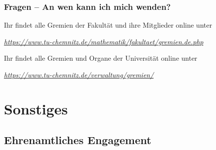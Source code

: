 \documentclass[10pt]{beamer}
\makeatletter
\newcommand{\highl}[1]{\color{tuccolor@ma}#1\color{black}}
\makeatother
\begin{document}
\begin{frame}
	\frametitle{Fragen -- An wen kann ich mich wenden?}

	Ihr findet alle Gremien der Fakultät und ihre Mitglieder online unter 

	\vspace*{0.5cm}

	\begin{center}
		\highl{\textit{\href{https://www.tu-chemnitz.de/mathematik/fakultaet/gremien.de.php}{https://www.tu-chemnitz.de/mathematik/fakultaet/gremien.de.php}}}
	\end{center}

	\vspace*{0.5cm}

	Ihr findet alle Gremien und Organe der Universität online unter 

	\vspace*{0.5cm}

	\begin{center}
		\highl{\textit{\href{https://www.tu-chemnitz.de/verwaltung/gremien/}{https://www.tu-chemnitz.de/verwaltung/gremien/}}}
	\end{center}
\end{frame}

\section{Sonstiges}
\frame{\tableofcontents[currentsection]}

\subsection*{Ehrenamtliches Engagement}
\end{document}
